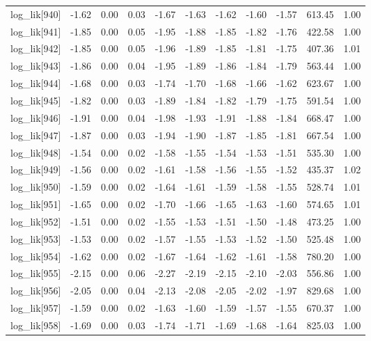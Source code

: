 \begin{table}[ht]
\begin{tabular}{rrrrrrrrrrr}
  log\_lik[940] & -1.62 & 0.00 & 0.03 & -1.67 & -1.63 & -1.62 & -1.60 & -1.57 & 613.45 & 1.00 \\ 
  log\_lik[941] & -1.85 & 0.00 & 0.05 & -1.95 & -1.88 & -1.85 & -1.82 & -1.76 & 422.58 & 1.00 \\ 
  log\_lik[942] & -1.85 & 0.00 & 0.05 & -1.96 & -1.89 & -1.85 & -1.81 & -1.75 & 407.36 & 1.01 \\ 
  log\_lik[943] & -1.86 & 0.00 & 0.04 & -1.95 & -1.89 & -1.86 & -1.84 & -1.79 & 563.44 & 1.00 \\ 
  log\_lik[944] & -1.68 & 0.00 & 0.03 & -1.74 & -1.70 & -1.68 & -1.66 & -1.62 & 623.67 & 1.00 \\ 
  log\_lik[945] & -1.82 & 0.00 & 0.03 & -1.89 & -1.84 & -1.82 & -1.79 & -1.75 & 591.54 & 1.00 \\ 
  log\_lik[946] & -1.91 & 0.00 & 0.04 & -1.98 & -1.93 & -1.91 & -1.88 & -1.84 & 668.47 & 1.00 \\ 
  log\_lik[947] & -1.87 & 0.00 & 0.03 & -1.94 & -1.90 & -1.87 & -1.85 & -1.81 & 667.54 & 1.00 \\ 
  log\_lik[948] & -1.54 & 0.00 & 0.02 & -1.58 & -1.55 & -1.54 & -1.53 & -1.51 & 535.30 & 1.00 \\ 
  log\_lik[949] & -1.56 & 0.00 & 0.02 & -1.61 & -1.58 & -1.56 & -1.55 & -1.52 & 435.37 & 1.02 \\ 
  log\_lik[950] & -1.59 & 0.00 & 0.02 & -1.64 & -1.61 & -1.59 & -1.58 & -1.55 & 528.74 & 1.01 \\ 
  log\_lik[951] & -1.65 & 0.00 & 0.02 & -1.70 & -1.66 & -1.65 & -1.63 & -1.60 & 574.65 & 1.01 \\ 
  log\_lik[952] & -1.51 & 0.00 & 0.02 & -1.55 & -1.53 & -1.51 & -1.50 & -1.48 & 473.25 & 1.00 \\ 
  log\_lik[953] & -1.53 & 0.00 & 0.02 & -1.57 & -1.55 & -1.53 & -1.52 & -1.50 & 525.48 & 1.00 \\ 
  log\_lik[954] & -1.62 & 0.00 & 0.02 & -1.67 & -1.64 & -1.62 & -1.61 & -1.58 & 780.20 & 1.00 \\ 
  log\_lik[955] & -2.15 & 0.00 & 0.06 & -2.27 & -2.19 & -2.15 & -2.10 & -2.03 & 556.86 & 1.00 \\ 
  log\_lik[956] & -2.05 & 0.00 & 0.04 & -2.13 & -2.08 & -2.05 & -2.02 & -1.97 & 829.68 & 1.00 \\ 
  log\_lik[957] & -1.59 & 0.00 & 0.02 & -1.63 & -1.60 & -1.59 & -1.57 & -1.55 & 670.37 & 1.00 \\ 
  log\_lik[958] & -1.69 & 0.00 & 0.03 & -1.74 & -1.71 & -1.69 & -1.68 & -1.64 & 825.03 & 1.00 \\ 

\end{tabular}
\end{table}
